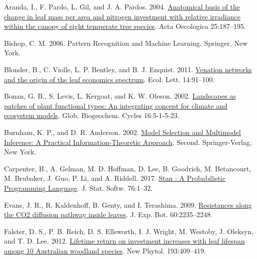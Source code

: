 \documentclass[
  12pt,
]{article}
\newlength{\cslhangindent}
\newlength{\cslentryspacingunit} %
\newenvironment{CSLReferences}[2] %
 {%
  \setlength{\parindent}{0pt}
  \ifodd #1
  \let\oldpar\par
  \def\par{\hangindent=\cslhangindent\oldpar}
  \fi
  \setlength{\parskip}{#2\cslentryspacingunit}
 }%
 {}
\begin{document}
\hypertarget{refs}{}
\begin{CSLReferences}{1}{0}
\leavevmode{}%
Aranda, I., F. Pardo, L. Gil, and J. A. Pardos. 2004. \href{https://doi.org/10.1016/j.actao.2004.01.003}{Anatomical basis of the change in leaf mass per area and nitrogen investment with relative irradiance within the canopy of eight temperate tree species}. Acta Oecologica 25:187--195.

\leavevmode{}%
Bishop, C. M. 2006. Pattern {Recognition} and {Machine Learning}. {Springer}, {New York}.

\leavevmode{}%
Blonder, B., C. Violle, L. P. Bentley, and B. J. Enquist. 2011. \href{https://doi.org/10.1111/j.1461-0248.2010.01554.x}{Venation networks and the origin of the leaf economics spectrum}. Ecol. Lett. 14:91--100.

\leavevmode{}%
Bonan, G. B., S. Levis, L. Kergoat, and K. W. Oleson. 2002. \href{https://doi.org/10.1029/2000GB001360}{Landscapes as patches of plant functional types: {An} integrating concept for climate and ecosystem models}. Glob. Biogeochem. Cycles 16:5-1-5-23.

\leavevmode{}%
Burnham, K. P., and D. R. Anderson. 2002. \href{https://doi.org/10.1007/b97636}{Model {Selection} and {Multimodel Inference}: {A Practical Information}-{Theoretic Approach}}. Second. {Springer-Verlag}, {New York}.

\leavevmode{}%
Carpenter, B., A. Gelman, M. D. Hoffman, D. Lee, B. Goodrich, M. Betancourt, M. Brubaker, J. Guo, P. Li, and A. Riddell. 2017. \href{https://doi.org/10.18637/jss.v076.i01}{Stan : {A Probabilistic Programming Language}}. J. Stat. Softw. 76:1--32.

\leavevmode{}%
Evans, J. R., R. Kaldenhoff, B. Genty, and I. Terashima. 2009. \href{https://doi.org/10.1093/jxb/erp117}{Resistances along the {CO2} diffusion pathway inside leaves}. J. Exp. Bot. 60:2235--2248.

\leavevmode{}%
Falster, D. S., P. B. Reich, D. S. Ellsworth, I. J. Wright, M. Westoby, J. Oleksyn, and T. D. Lee. 2012. \href{https://doi.org/10.1111/j.1469-8137.2011.03940.x}{Lifetime return on investment increases with leaf lifespan among 10 {Australian} woodland species}. New Phytol. 193:409--419.


\end{CSLReferences}
\end{document}
